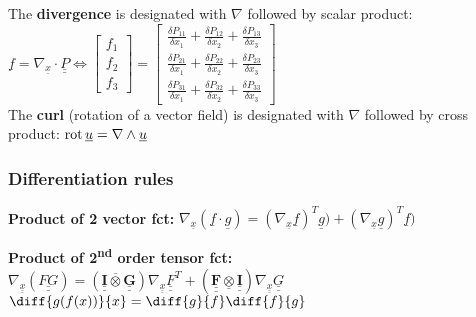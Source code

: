 The \textbf{divergence} is designated with $\nabla$ followed by scalar product: $\underline{f} = \nabla_{\underline{x}} \cdot \underline{\underline{P}} \Leftrightarrow \left[\begin{smallmatrix} f_{1} \\ f_{2} \\ f_{3}\end{smallmatrix}\right] = \left[\begin{smallmatrix} \frac{\delta P_{11}}{\delta x_1} + \frac{\delta P_{12}}{\delta x_2} + \frac{\delta P_{13}}{\delta x_3} \\ \frac{\delta P_{21}}{\delta x_1} + \frac{\delta P_{22}}{\delta x_2} + \frac{\delta P_{23}}{\delta x_3} \\ \frac{\delta P_{31}}{\delta x_1} + \frac{\delta P_{32}}{\delta x_2} + \frac{\delta P_{33}}{\delta x_3} \end{smallmatrix}\right]$ \\

The \textbf{curl} (rotation of a vector field)  is designated with $\nabla$ followed by cross product: $\operatorname{rot}{\underline{u}} = \nabla \wedge \underline{u}$ \\

\subsubsection*{Differentiation rules}

\textbf{Product of 2 vector fct:} $\nabla_{\underline{x}}(\underline{f} \cdot \underline{g}) = {(\nabla_{\underline{x}}\underline{f})}^T \underline{g}) + {(\nabla_{\underline{x}}\underline{g})}^T \underline{f})$

\textbf{Product of 2\textsuperscript{nd} order tensor fct:} $\nabla_{\underline{\underline{x}}}(\underline{\underline{FG}}) = (\underline{\underline{\mathbf{I}}} \overline{\otimes} \underline{\underline{\mathbf{G}}}) \nabla_{\underline{\underline{x}}}\underline{\underline{F}}^T + (\underline{\underline{\mathbf{F}}} \underline{\otimes} \underline{\underline{\mathbf{I}}}) \nabla_{\underline{\underline{x}}}\underline{\underline{G}}$ \\
$\diff{g(f(x))}{x} = \diff{g}{f} \diff{f}{g}$